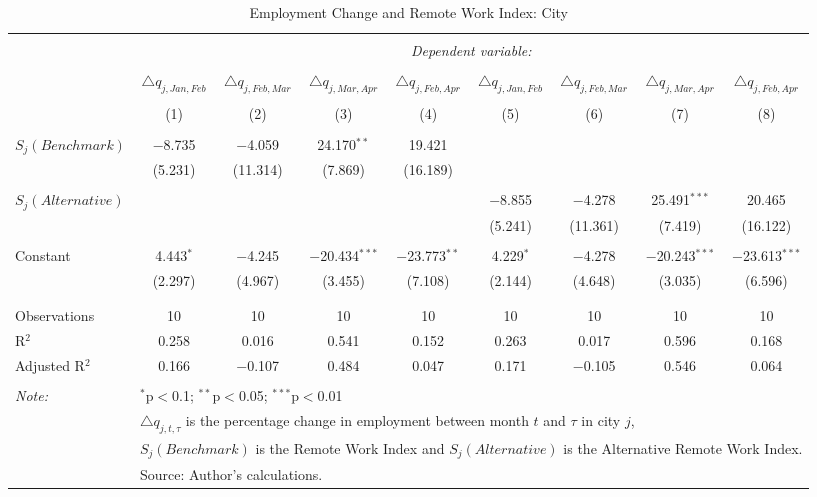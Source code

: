 
\begin{table}[!htbp] \centering 
  \caption{Employment Change and Remote Work Index: City} 
  \label{tab:regression_dynamics_city} 
\footnotesize 
\begin{tabular}{@{\extracolsep{5pt}}lcccccccc} 
\\[-1.8ex]\hline 
\hline \\[-1.8ex] 
 & \multicolumn{8}{c}{\textit{Dependent variable:}} \\ 
\cline{2-9} 
\\[-1.8ex] & $\triangle q_{j,Jan,Feb}$ & $\triangle q_{j,Feb,Mar}$ & $\triangle q_{j,Mar,Apr}$ & $\triangle q_{j,Feb,Apr}$ & $\triangle q_{j,Jan,Feb}$ & $\triangle q_{j,Feb,Mar}$ & $\triangle q_{j,Mar,Apr}$ & $\triangle q_{j,Feb,Apr}$ \\ 
\\[-1.8ex] & (1) & (2) & (3) & (4) & (5) & (6) & (7) & (8)\\ 
\hline \\[-1.8ex] 
 $S_{j}(Benchmark)$ & $-$8.735 & $-$4.059 & 24.170$^{**}$ & 19.421 &  &  &  &  \\ 
  & (5.231) & (11.314) & (7.869) & (16.189) &  &  &  &  \\ 
  & & & & & & & & \\ 
 $S_{j}(Alternative)$ &  &  &  &  & $-$8.855 & $-$4.278 & 25.491$^{***}$ & 20.465 \\ 
  &  &  &  &  & (5.241) & (11.361) & (7.419) & (16.122) \\ 
  & & & & & & & & \\ 
 Constant & 4.443$^{*}$ & $-$4.245 & $-$20.434$^{***}$ & $-$23.773$^{**}$ & 4.229$^{*}$ & $-$4.278 & $-$20.243$^{***}$ & $-$23.613$^{***}$ \\ 
  & (2.297) & (4.967) & (3.455) & (7.108) & (2.144) & (4.648) & (3.035) & (6.596) \\ 
  & & & & & & & & \\ 
\hline \\[-1.8ex] 
Observations & 10 & 10 & 10 & 10 & 10 & 10 & 10 & 10 \\ 
R$^{2}$ & 0.258 & 0.016 & 0.541 & 0.152 & 0.263 & 0.017 & 0.596 & 0.168 \\ 
Adjusted R$^{2}$ & 0.166 & $-$0.107 & 0.484 & 0.047 & 0.171 & $-$0.105 & 0.546 & 0.064 \\ 
\hline 
\hline \\[-1.8ex] 
\textit{Note:}  & \multicolumn{8}{l}{$^{*}$p$<$0.1; $^{**}$p$<$0.05; $^{***}$p$<$0.01} \\ 
 & \multicolumn{8}{l}{$\triangle q_{j,t,\tau}$ is the percentage change in employment between month $t$ and $\tau$ in city $j$,} \\ 
 & \multicolumn{8}{l}{$S_{j} (Benchmark)$ is the Remote Work Index and $S_{j} (Alternative)$ is the Alternative Remote Work Index.} \\ 
 & \multicolumn{8}{l}{Source: Author's calculations.} \\ 
\end{tabular} 
\end{table} 
